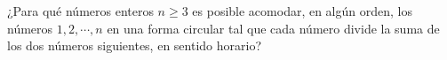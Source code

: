 ¿Para qué números enteros $ n\ge 3$ es posible acomodar, en algún orden, los números $ 1,2,\cdots, n$ en una forma circular tal que cada número divide la suma de los dos números siguientes, en sentido horario?
